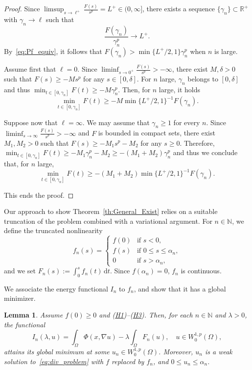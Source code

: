 \documentclass[10pt,twoside,english,reqno,a4paper]{amsart}
\theoremstyle{plain}
\theoremstyle{plain}
\newtheorem{lemma}[theorem]{Lemma}
\theoremstyle{definition}
\theoremstyle{remark}
\numberwithin{equation}{section}
\newcommand{\N}{\mathbb{N}}
\newcommand{\R}{\mathbb{R}}
\def\sob{W^{1,p}_{0}(\Omega)}
\def\into{\int_{\Omega}}
\newcommand{\oL}{L^+}
\begin{document}
\begin{proof}
Since $\limsup_{s\to \ell^+} \frac{F(s)}{s^p} = \oL \in (0,\infty]$, there exists a sequence $\{\gamma_n\} \subset \R^+$ with $\gamma_n \to \ell$ such that
\begin{equation}
\label{eq:Pf_equiv}
\frac{F(\gamma_n)}{\gamma_n^p} \to \oL.
\end{equation}
By~\eqref{eq:Pf_equiv}, it follows that $F(\gamma_n) > \min\{\oL/2,1\} \gamma_n^p$ when $n$ is large.

Assume first that $\ell=0$. Since $\liminf_{s\to 0^+} \frac{F(s)}{s^p} > -\infty$, there exist $M,\delta>0$ such that $F(s)\geq -Ms^p$ for any $s\in [0,\delta]$. For $n$ large, $\gamma_n$ belongs to $[0,\delta]$ and thus $\min_{t\in [0,\gamma_n]} F(t) \geq -M\gamma_n^p$. Then, for $n$ large, it holds
\[
\min_{t\in [0,\gamma_n]} F(t) \geq - M \min\{\oL/2,1\}^{-1} F(\gamma_n).
\]

Suppose now that $\ell=\infty$. We may assume that $\gamma_n\geq 1$ for every $n$. Since $\liminf_{s\to \infty} \frac{F(s)}{s^p} > -\infty$ and $F$ is bounded in compact sets, there exist $M_1,M_2>0$ such that $F(s)\geq -M_1s^p - M_2$ for any $s\geq 0$. Therefore, $\min_{t\in[0,\gamma_n]} F(t)\geq -M_1\gamma_n^p - M_2 \geq -(M_1+M_2)\gamma_n^p$ and thus we conclude that, for $n$ large,
\[
\min_{t\in[0,\gamma_n]} F(t)\geq -(M_1+M_2) \min\{\oL/2,1\}^{-1} F(\gamma_n).
\]

This ends the proof.
\end{proof}

Our approach to show Theorem~\ref{th:General_Exist} relies on a suitable truncation of the problem combined with a variational argument. For $n \in \N$, we define the truncated nonlinearity
\begin{equation*}
f_n(s) = \begin{cases}
f(0) & \text{if } s<0,\\
f(s) & \text{if } 0\leq s\leq \alpha_{n},\\
0  & \text{if } s>\alpha_{n},
\end{cases}
\end{equation*}
and we set $F_n(s) :=\int_0^s f_n(t)\, \mathrm{d}t$. Since $f(\alpha_n) = 0$, $f_n$ is continuous. 

We associate the energy functional $I_n$ to $f_n$, and show that it has a global minimizer.

\begin{lemma}\label{lem:minimizer}
Assume $f(0)\geq 0$ and \textnormal{(\hyperlink{hyp:potential}{H1})--(\hyperlink{hyp:convex}{H3})}. Then, for each $n\in\N$ and $\lambda > 0$, the functional
\[
I_n(\lambda,u) = \into \Phi(x,\nabla u) - \lambda \into F_n(u),\quad u\in\sob,
\]
attains its global minimum at some $u_n \in \sob$. Moreover, $u_n$ is a weak solution to~\eqref{eq:div_problem} with $f$ replaced by $f_n$, and $0\leq u_n\leq\alpha_{n}$.
\end{lemma}
\end{document}
